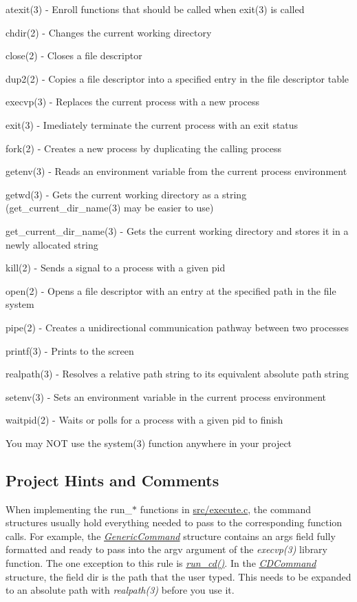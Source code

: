 \begin{DoxyItemize}
\item atexit(3) -\/ Enroll functions that should be called when exit(3) is called
\item chdir(2) -\/ Changes the current working directory
\item close(2) -\/ Closes a file descriptor
\item dup2(2) -\/ Copies a file descriptor into a specified entry in the file descriptor table
\item execvp(3) -\/ Replaces the current process with a new process
\item exit(3) -\/ Imediately terminate the current process with an exit status
\item fork(2) -\/ Creates a new process by duplicating the calling process
\item getenv(3) -\/ Reads an environment variable from the current process environment
\item getwd(3) -\/ Gets the current working directory as a string (get\+\_\+current\+\_\+dir\+\_\+name(3) may be easier to use)
\item get\+\_\+current\+\_\+dir\+\_\+name(3) -\/ Gets the current working directory and stores it in a newly allocated string
\item kill(2) -\/ Sends a signal to a process with a given pid
\item open(2) -\/ Opens a file descriptor with an entry at the specified path in the file system
\item pipe(2) -\/ Creates a unidirectional communication pathway between two processes
\item printf(3) -\/ Prints to the screen
\item realpath(3) -\/ Resolves a relative path string to its equivalent absolute path string
\item setenv(3) -\/ Sets an environment variable in the current process environment
\item waitpid(2) -\/ Waits or polls for a process with a given pid to finish
\end{DoxyItemize}

You may N\+OT use the system(3) function anywhere in your project

\subsection*{Project Hints and Comments}

When implementing the run\+\_\+$\ast$ functions in \hyperlink{execute_8c}{src/execute.\+c}, the command structures usually hold everything needed to pass to the corresponding function calls. For example, the {\itshape \hyperlink{structGenericCommand}{Generic\+Command}} structure contains an args field fully formatted and ready to pass into the argv argument of the {\itshape execvp(3)} library function. The one exception to this rule is {\itshape \hyperlink{execute_8c_a8e9aed155e5ccf7e207a8f3ce4789d83}{run\+\_\+cd()}}. In the {\itshape \hyperlink{structCDCommand}{C\+D\+Command}} structure, the field dir is the path that the user typed. This needs to be expanded to an absolute path with {\itshape realpath(3)} before you use it.

